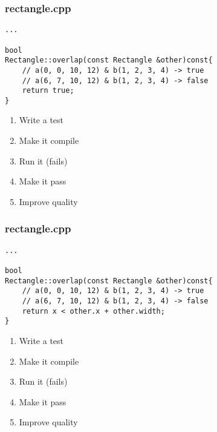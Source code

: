 \begin{frame}[fragile]
\frametitle{rectangle.cpp}
\begin{minipage}[t]{0.48\linewidth}
\begin{lstlisting}
...

bool 
Rectangle::overlap(const Rectangle &other)const{
    // a(0, 0, 10, 12) & b(1, 2, 3, 4) -> true
    // a(6, 7, 10, 12) & b(1, 2, 3, 4) -> false
    return true;
}
\end{lstlisting}
\end{minipage}\hfill
\begin{minipage}[t]{0.28\linewidth}
  \small
  \begin{enumerate} 
    \item \textcolor{deadcolor}{Write a test}
    \item \textcolor{deadcolor}{Make it compile}
    \item \textcolor{deadcolor}{Run it (fails)}
    \item \textcolor{activecolor}{Make it pass}
    \item \textcolor{deadcolor}{Improve quality}
  \end{enumerate} 
\end{minipage}
\end{frame}

\begin{frame}[fragile]
\frametitle{rectangle.cpp}
\begin{minipage}[t]{0.48\linewidth}
\begin{lstlisting}
...

bool 
Rectangle::overlap(const Rectangle &other)const{
    // a(0, 0, 10, 12) & b(1, 2, 3, 4) -> true
    // a(6, 7, 10, 12) & b(1, 2, 3, 4) -> false
    return x < other.x + other.width;
}
\end{lstlisting}
\end{minipage}\hfill
\begin{minipage}[t]{0.28\linewidth}
  \small
  \begin{enumerate} 
    \item \textcolor{deadcolor}{Write a test}
    \item \textcolor{deadcolor}{Make it compile}
    \item \textcolor{deadcolor}{Run it (fails)}
    \item \textcolor{activecolor}{Make it pass}
    \item \textcolor{deadcolor}{Improve quality}
  \end{enumerate} 
\end{minipage}
\end{frame}


